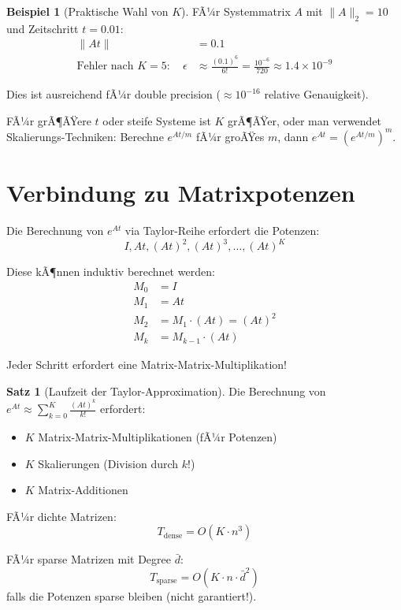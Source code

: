 ﻿\documentclass[a4paper,12pt]{report}
\theoremstyle{definition}
\newtheorem{beispiel}{Beispiel}
\newtheorem{satz}{Satz}
\begin{document}
	\begin{beispiel}[Praktische Wahl von $K$]
		FÃ¼r Systemmatrix $A$ mit $\|A\|_2 = 10$ und Zeitschritt $t = 0.01$:
		\begin{align}
			\|At\| &= 0.1 \\
			\text{Fehler nach } K=5: \quad \epsilon &\approx \frac{(0.1)^6}{6!} = \frac{10^{-6}}{720} \approx 1.4 \times 10^{-9}
		\end{align}
		
		Dies ist ausreichend fÃ¼r double precision ($\approx 10^{-16}$ relative Genauigkeit).
		
		FÃ¼r grÃ¶ÃŸere $t$ oder steife Systeme ist $K$ grÃ¶ÃŸer, oder man verwendet Skalierungs-Techniken: Berechne $e^{At/m}$ fÃ¼r groÃŸes $m$, dann $e^{At} = (e^{At/m})^m$.
	\end{beispiel}
	
	\section{Verbindung zu Matrixpotenzen}
	
	Die Berechnung von $e^{At}$ via Taylor-Reihe erfordert die Potenzen:
	\[
	I, At, (At)^2, (At)^3, \ldots, (At)^K
	\]
	
	Diese kÃ¶nnen induktiv berechnet werden:
	\begin{align}
		M_0 &= I \\
		M_1 &= At \\
		M_2 &= M_1 \cdot (At) = (At)^2 \\
		M_k &= M_{k-1} \cdot (At)
	\end{align}
	
	Jeder Schritt erfordert eine Matrix-Matrix-Multiplikation!
	
	\begin{satz}[Laufzeit der Taylor-Approximation]
		Die Berechnung von $e^{At} \approx \sum_{k=0}^K \frac{(At)^k}{k!}$ erfordert:
		\begin{itemize}
			\item $K$ Matrix-Matrix-Multiplikationen (fÃ¼r Potenzen)
			\item $K$ Skalierungen (Division durch $k!$)
			\item $K$ Matrix-Additionen
		\end{itemize}
		
		FÃ¼r dichte Matrizen:
		\[
		T_{\text{dense}} = O(K \cdot n^3)
		\]
		
		FÃ¼r sparse Matrizen mit Degree $\bar{d}$:
		\[
		T_{\text{sparse}} = O(K \cdot n \cdot \bar{d}^2)
		\]
		falls die Potenzen sparse bleiben (nicht garantiert!).
	\end{satz}
	
\end{document}
